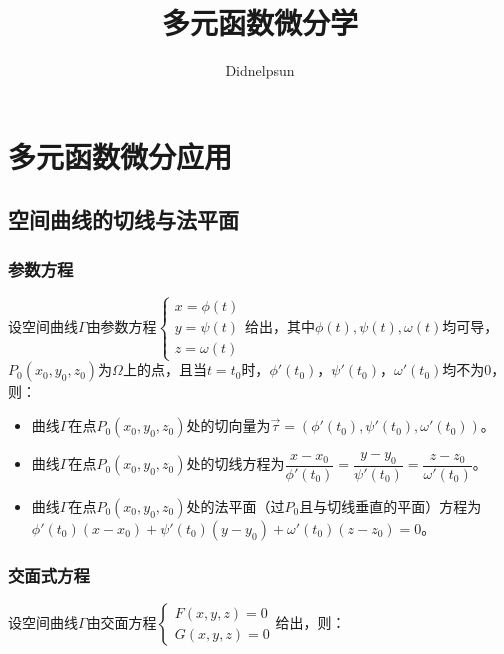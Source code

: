 \documentclass[UTF8, 12pt]{ctexart}
\author{Didnelpsun}
\title{多元函数微分学}
\date{}
\begin{document}
\maketitle
\pagestyle{empty}
\thispagestyle{empty}
\tableofcontents
\thispagestyle{empty}
\newpage
\pagestyle{plain}
\setcounter{page}{1}
\section{多元函数微分应用}

\subsection{空间曲线的切线与法平面}

\subsubsection{参数方程}

设空间曲线$\varGamma$由参数方程$\left\{\begin{array}{l}
    x=\phi(t) \\
    y=\psi(t) \\
    z=\omega(t)
\end{array}\right.$给出，其中$\phi(t),\psi(t),\omega(t)$均可导，$P_0(x_0,y_0,z_0)$为$\varOmega$上的点，且当$t=t_0$时，$\phi'(t_0)$，$\psi'(t_0)$，$\omega'(t_0)$均不为0，则：

\begin{itemize}
    \item 曲线$\varGamma$在点$P_0(x_0,y_0,z_0)$处的切向量为$\vec{\tau}=(\phi'(t_0),\psi'(t_0),\omega'(t_0))$。
    \item 曲线$\varGamma$在点$P_0(x_0,y_0,z_0)$处的切线方程为$\dfrac{x-x_0}{\phi'(t_0)}=\dfrac{y-y_0}{\psi'(t_0)}=\dfrac{z-z_0}{\omega'(t_0)}$。
    \item 曲线$\varGamma$在点$P_0(x_0,y_0,z_0)$处的法平面（过$P_0$且与切线垂直的平面）方程为$\phi'(t_0)(x-x_0)+\psi'(t_0)(y-y_0)+\omega'(t_0)(z-z_0)=0$。
\end{itemize}

\subsubsection{交面式方程}

设空间曲线$\varGamma$由交面方程$\left\{\begin{array}{l}
    F(x,y,z)=0 \\
    G(x,y,z)=0
\end{array}\right.$给出，则：
\end{document}
